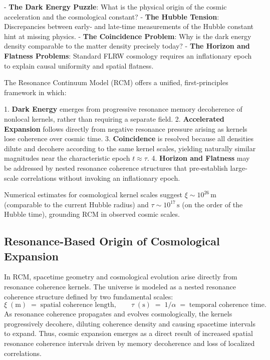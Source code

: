 - \textbf{The Dark Energy Puzzle}: What is the physical origin of the cosmic acceleration and the cosmological constant?  
- \textbf{The Hubble Tension}: Discrepancies between early‐ and late‐time measurements of the Hubble constant hint at missing physics.  
- \textbf{The Coincidence Problem}: Why is the dark energy density comparable to the matter density precisely today?  
- \textbf{The Horizon and Flatness Problems}: Standard FLRW cosmology requires an inflationary epoch to explain causal uniformity and spatial flatness.

The Resonance Continuum Model (RCM) offers a unified, first‐principles framework in which:

1. \textbf{Dark Energy} emerges from progressive resonance memory decoherence of nonlocal kernels, rather than requiring a separate field.  
2. \textbf{Accelerated Expansion} follows directly from negative resonance pressure arising as kernels lose coherence over cosmic time.  
3. \textbf{Coincidence} is resolved because all densities dilute and decohere according to the same kernel scales, yielding naturally similar magnitudes near the characteristic epoch \(t\approx\tau\).  
4. \textbf{Horizon and Flatness} may be addressed by nested resonance coherence structures that pre‐establish large‐scale correlations without invoking an inflationary epoch.

Numerical estimates for cosmological kernel scales suggest \(\xi\sim10^{26}\,\mathrm{m}\) (comparable to the current Hubble radius) and \(\tau\sim10^{17}\,\mathrm{s}\) (on the order of the Hubble time), grounding RCM in observed cosmic scales.

\subsection{Resonance-Based Origin of Cosmological Expansion}

In RCM, spacetime geometry and cosmological evolution arise directly from resonance coherence kernels. The universe is modeled as a nested resonance coherence structure defined by two fundamental scales:
\[
\xi\;(\mathrm{m})\;=\;\text{spatial coherence length}, 
\qquad
\tau\;(\mathrm{s})\;=\;1/\alpha\;=\;\text{temporal coherence time}.
\]
As resonance coherence propagates and evolves cosmologically, the kernels progressively decohere, diluting coherence density and causing spacetime intervals to expand. Thus, cosmic expansion emerges as a direct result of increased spatial resonance coherence intervals driven by memory decoherence and loss of localized correlations.


